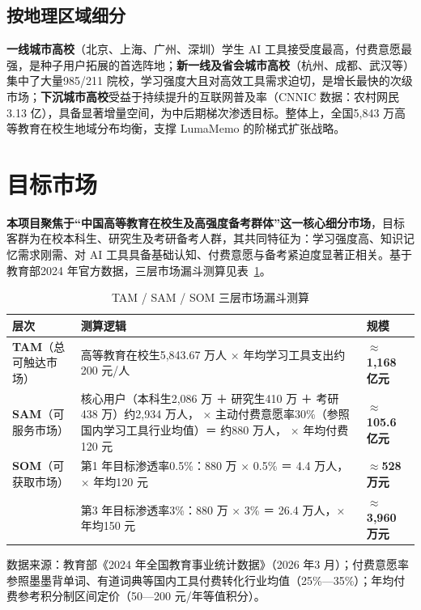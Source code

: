 \subsection{按地理区域细分}

\textbf{一线城市高校}（北京、上海、广州、深圳）学生 AI 工具接受度最高，付费意愿最强，是种子用户拓展的首选阵地；\textbf{新一线及省会城市高校}（杭州、成都、武汉等）集中了大量985/211 院校，学习强度大且对高效工具需求迫切，是增长最快的次级市场；\textbf{下沉城市高校}受益于持续提升的互联网普及率（CNNIC 数据：农村网民3.13 亿），具备显著增量空间，为中后期梯次渗透目标。整体上，全国5,843 万高等教育在校生地域分布均衡，支撑 LumaMemo 的阶梯式扩张战略。

\section{目标市场}

\textbf{本项目聚焦于“中国高等教育在校生及高强度备考群体”这一核心细分市场}，目标客群为在校本科生、研究生及考研备考人群，其共同特征为：学习强度高、知识记忆需求刚需、对 AI 工具具备基础认知、付费意愿与备考紧迫度显著正相关。基于教育部2024 年官方数据，三层市场漏斗测算见表~\ref{tab:market_funnel}。

\begin{table}[htbp]
  \centering
  \caption{TAM / SAM / SOM 三层市场漏斗测算}
  \label{tab:market_funnel}
  \begin{tabular}{p{2.5cm}p{8.2cm}p{2.0cm}}
    \toprule
    \textbf{层次} & \textbf{测算逻辑} & \textbf{规模} \\
    \midrule
    \textbf{TAM}\newline（总可触达市场）
      & 高等教育在校生5,843.67 万人 × 年均学习工具支出约200 元/人
      & \textbf{$\approx$1,168 亿元} \\[6pt]
    \textbf{SAM}\newline（可服务市场）
      & 核心用户（本科生2,086 万 ＋ 研究生410 万 ＋ 考研438 万）约2,934 万人，\newline
        × 主动付费意愿率30\%（参照国内学习工具行业均值）＝ 约880 万人，\newline
        × 年均付费120 元
      & \textbf{$\approx$105.6 亿元} \\[6pt]
    \textbf{SOM}\newline（可获取市场）
      & 第1 年目标渗透率0.5\%：880 万 × 0.5\% ＝ 4.4 万人，× 年均120 元
      & \textbf{$\approx$528 万元} \\[4pt]
      & 第3 年目标渗透率3\%：880 万 × 3\% ＝ 26.4 万人，× 年均150 元
      & \textbf{$\approx$3,960 万元} \\
    \bottomrule
  \end{tabular}
  \begin{flushleft}
    \footnotesize 数据来源：教育部《2024 年全国教育事业统计数据》（2026 年3 月）；付费意愿率参照墨墨背单词、有道词典等国内工具付费转化行业均值（25\%—35\%）；年均付费参考积分制区间定价（50—200 元/年等值积分）。
  \end{flushleft}
\end{table}

